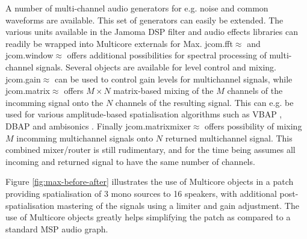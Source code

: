 \documentclass[twoside,a4paper]{article}
\begin{document}
A number of multi-channel audio generators for e.g. noise and common waveforms are available.
This set of generators can easily be extended.
The various units available in the Jamoma DSP filter and audio effects libraries can readily be wrapped into Multicore externals for Max.
jcom.fft$\approx$ and jcom.window$\approx$ offers additional possibilities for spectral processing of multi-channel signals.
Several objects are available for level control and mixing. 
jcom.gain$\approx$ can be used to control gain levels for multichannel signals, while jcom.matrix$\approx$ offers $M \times N$ matrix-based mixing of the $M$ channels of the incomming signal onto the $N$ channels of the resulting signal. This can e.g. be used for various amplitude-based spatialisation algorithms such as VBAP \cite{Pulkki:1997vbap}, DBAP \cite{lossius:2009} and ambisonics \cite{Schacher:2006ambi_max}.
Finally jcom.matrixmixer$\approx$ offers possibility of mixing $M$ incomming multichannel signals onto $N$ returned multichannel signal.
This combined mixer/router is still rudimentary, and for the time being assumes all incoming and returned signal to have the same number of channels.

Figure \ref{fig:max-before-after} illustrates the use of Multicore objects in a patch providing spatialisation of 3 mono sources to 16 speakers, with additional post-spatialisation mastering of the signals using a limiter and gain adjustment.
The use of Multicore objects greatly helps simplifying the patch as compared to a standard MSP audio graph. 


\end{document}
